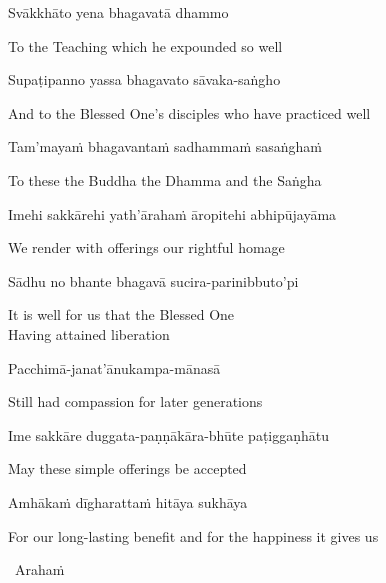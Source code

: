 Svākkhāto yena bhagavatā dhammo

\begin{english}
  To the Teaching which he expounded so well
\end{english}

Supaṭipanno yassa bhagavato sāvaka-saṅgho

\begin{english}
  And to the Blessed One's disciples who have practiced well
\end{english}

Tam'mayaṁ bhagavantaṁ sadhammaṁ sasaṅghaṁ

\begin{english}
  To these the Buddha the Dhamma and the Saṅgha
\end{english}

Imehi sakkārehi yath'ārahaṁ āropitehi abhipūjayāma

\begin{english}
  We render with offerings our rightful homage
\end{english}

Sādhu no bhante bhagavā sucira-parinibbuto'pi

\begin{english}
  It is well for us that the Blessed One\\
  Having attained liberation
\end{english}

Pacchimā-janat'ānukampa-mānasā

\begin{english}
  Still had compassion for later generations
\end{english}

Ime sakkāre duggata-paṇṇākāra-bhūte paṭiggaṇhātu

\begin{english}
  May these simple offerings be accepted
\end{english}

Amhākaṁ dīgharattaṁ hitāya sukhāya

\begin{english}
  For our long-lasting benefit and for the happiness it gives us
\end{english}

\clearpage

\begin{leader}
  \anglebracketleft\ \hspace{-0.5mm}Arahaṁ \hspace{-0.5mm}\anglebracketright\
\end{leader}

